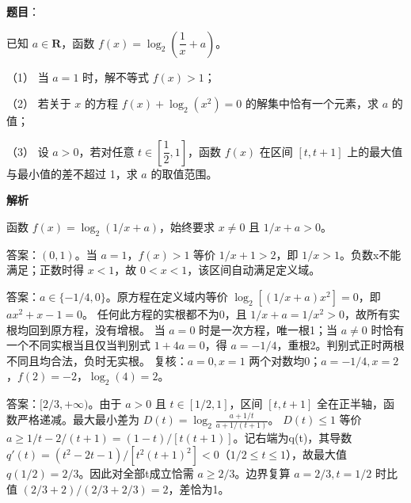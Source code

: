 \begin{answer}

\textbf{题目}：

已知 \(a\in\mathbf R\)，函数 \(f(x)=\log_2\left(\dfrac1x+a\right)\)。

（1） 当 \(a=1\) 时，解不等式 \(f(x)>1\)；

（2） 若关于 \(x\) 的方程 \(f(x)+\log_2(x^2)=0\) 的解集中恰有一个元素，求 \(a\) 的值；

（3） 设 \(a>0\)，若对任意 \(t\in\left[\dfrac12,1\right]\)，函数 \(f(x)\) 在区间 \([t,t+1]\) 上的最大值与最小值的差不超过 1，求 \(a\) 的取值范围。

\textbf{解析}

函数 \(f(x)=\log_2(1/x+a)\)，始终要求 \(x\ne0\) 且 \(1/x+a>0\)。


答案：\((0,1)\)。当 \(a=1\)，\(f(x)>1\) 等价 \(1/x+1>2\)，即 \(1/x>1\)。负数x不能满足；正数时得 \(x<1\)，故 \(0<x<1\)，该区间自动满足定义域。


答案：\(a\in\{-1/4,0\}\)。原方程在定义域内等价
\(\log_2[(1/x+a)x^2]=0\)，即 \(ax^2+x-1=0\)。
任何此方程的实根都不为0，且 \(1/x+a=1/x^2>0\)，故所有实根均回到原方程，没有增根。
当 \(a=0\) 时是一次方程，唯一根1；当 \(a\ne0\) 时恰有一个不同实根当且仅当判别式 \(1+4a=0\)，得 \(a=-1/4\)，重根2。判别式正时两根不同且均合法，负时无实根。
复核：\(a=0,x=1\) 两个对数均0；\(a=-1/4,x=2\)，\(f(2)=-2\)，\(\log_2(4)=2\)。


答案：\([2/3,+\infty)\)。由于 \(a>0\) 且 \(t\in[1/2,1]\)，区间 \([t,t+1]\) 全在正半轴，函数严格递减。最大最小差为
\(D(t)=\log_2\frac{a+1/t}{a+1/(t+1)}\)。
\(D(t)\le1\) 等价 \(a\ge1/t-2/(t+1)=(1-t)/[t(t+1)]\)。记右端为q(t)，其导数
\(q'(t)=(t^2-2t-1)/[t^2(t+1)^2]<0\)（\(1/2\le t\le1\)），故最大值 \(q(1/2)=2/3\)。因此对全部t成立恰需 \(a\ge2/3\)。边界复算 \(a=2/3,t=1/2\) 时比值 \((2/3+2)/(2/3+2/3)=2\)，差恰为1。



\gkanswer{答案（3）：\([\dfrac23,+\infty)\)。}

\end{answer}